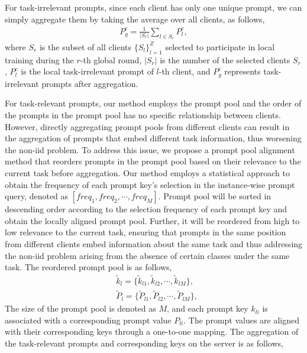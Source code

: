 \documentclass[sigconf,anonymous,review,screen]{acmart}
\begin{document}
For task-irrelevant prompts, since each client has only one unique prompt, we can simply aggregate them by taking the average over all clients, as follows,
\begin{equation}\label{eqn-9}
	\begin{aligned}
		P_g^c = \frac{1}{\left| S_r \right|} \sum_{l \in S_r} {P}_l^c,
	\end{aligned}
\end{equation}
where $S_r$ is the subset of all clients $\{S_l\}_{l=1}^Z$ selected to participate in local training during the $r$-th global round, $\left| S_r \right|$ is the number of the selected clients $S_r$, ${P}_l^c$ is the local task-irrelevant prompt of $l$-th client, and $P_g^c$ represents task-irrelevant prompts after aggregation.

For task-relevant prompts, our method employs the prompt pool and the order of the prompts in the prompt pool has no specific relationship between clients. However, directly aggregating prompt pools from different clients can result in the aggregation of prompts that embed different task information, thus worsening the non-iid problem. To address this issue, we propose a prompt pool alignment method that reorders prompts in the prompt pool based on their relevance to the current task before aggregation. Our method employs a statistical approach to obtain the frequency of each prompt key's selection in the instance-wise prompt query, denoted as $[freq_1,freq_2,\cdots,freq_M]$. Prompt pool will be sorted in descending order according to the selection frequency of each prompt key and obtain the locally aligned prompt pool. Further, it will be reordered from high to low relevance to the current task, ensuring that prompts in the same position from different clients embed information about the same task and thus addressing the non-iid problem arising from the absence of certain classes under the same task. The reordered prompt pool is as follows,
\begin{equation}\label{eqn-10}
	\begin{aligned}
		&\tilde{k}_l = \{ \tilde{k}_{l1}, \tilde{k}_{l2}, \cdots, \tilde{k}_{lM} \}, \\
		&\tilde{P}_l = \{ \tilde{P}_{l1}, \tilde{P}_{l2}, \cdots, \tilde{P}_{lM} \},
	\end{aligned}
\end{equation}
The size of the prompt pool is denoted as $M$, and each prompt key $k_{li}$ is associated with a corresponding prompt value $P_{li}$.  The prompt values are aligned with their corresponding keys through a one-to-one mapping. The aggregation of the task-relevant prompts and corresponding keys on the server is as follows,
\end{document}

